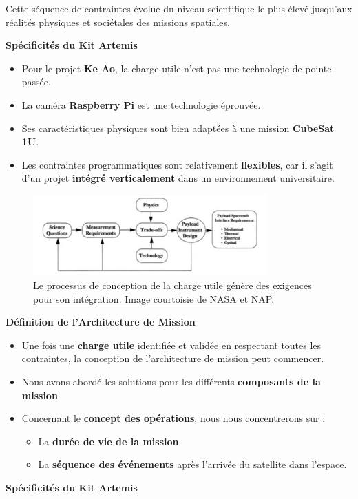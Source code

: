 Cette séquence de contraintes évolue du niveau scientifique le plus élevé jusqu'aux réalités physiques et sociétales des missions spatiales.

\textbf{Spécificités du Kit Artemis}
\begin{itemize}
    \item Pour le projet \textbf{Ke Ao}, la charge utile n'est pas une technologie de pointe passée.  
    \item La caméra \textbf{Raspberry Pi} est une technologie éprouvée.  
    \item Ses caractéristiques physiques sont bien adaptées à une mission \textbf{CubeSat 1U}.  
    \item Les contraintes programmatiques sont relativement \textbf{flexibles}, car il s'agit d'un projet \textbf{intégré verticalement} dans un environnement universitaire.  
\end{itemize}
\begin{figure}[H]
    \centering
    \includegraphics[width=0.8\textwidth]{figures/3.16.jpg}
    \caption{\protect\href{https://nap.nationalacademies.org/read/9819/chapter/5\#23}
    {Le processus de conception de la charge utile génère des exigences pour son intégration. Image courtoisie de NASA et NAP.}}
    \label{fig:communication2}
\end{figure}
\textbf{Définition de l'Architecture de Mission}

\begin{itemize}
    \item Une fois une \textbf{charge utile} identifiée et validée en respectant toutes les contraintes, la conception de l'architecture de mission peut commencer.
    \item Nous avons abordé les solutions pour les différents \textbf{composants de la mission}.
    \item Concernant le \textbf{concept des opérations}, nous nous concentrerons sur :
    \begin{itemize}
        \item La \textbf{durée de vie de la mission}.  
        \item La \textbf{séquence des événements} après l'arrivée du satellite dans l'espace.  
    \end{itemize}
\end{itemize}
\textbf{Spécificités du Kit Artemis}


